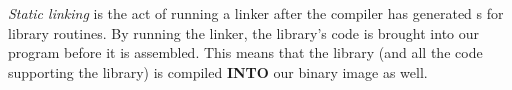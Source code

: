 \begin{definition}\label{def:Static_Linking}
  \emph{Static linking} is the act of running a linker after the compiler has generated s for library routines.
  By running the linker, the library's code is brought into our program before it is assembled.
  This means that the library (and all the code supporting the library) is compiled \textbf{INTO} our binary image as well.
\end{definition}

